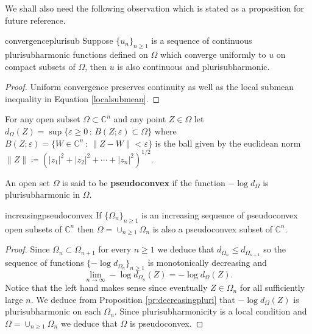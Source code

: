 We shall also need the following observation which is stated as a proposition for future reference.

\begin{myprop}{}{convergenceplurisub}
Suppose $\{u_n\}_{n\geq 1}$ is a sequence of continuous plurisubharmonic functions defined on $\Omega$ which converge uniformly to $u$ on compact subsets of $\Omega$, then $u$ is also continuous and plurisubharmonic.
\end{myprop}

\begin{proof}
Uniform convergence preserves continuity as well as the local submean inequality in Equation \ref{localsubmean}.
\end{proof}
For any open subset $\Omega\subset \mathbb{C}^n$ and any point $Z\in \Omega$ let $d_\Omega(Z) = \sup \{\varepsilon\geq 0\,:\, B(Z;\varepsilon)\subset \Omega\}$ where $B(Z;\varepsilon) = \{W\in \mathbb{C}^n\,:\, \|Z-W\|<\varepsilon\}$ is the ball given by the euclidean norm $\|Z\|\coloneqq (|z_1|^2+|z_2|^2+\cdots+|z_n|^2)^{1/2}$. \\

\begin{mydef}{}{}
An open set $\Omega$ is said to be {\bf pseudoconvex} if the function $-\log d_\Omega$ is plurisubharmonic in $\Omega$.
\end{mydef}

\begin{mytheo}{}{increasingpseudoconvex}
If $\{\Omega_n\}_{n\geq 1}$ is an increasing sequence of pseudoconvex open subsets of $\mathbb{C}^n$ then $\Omega = \cup_{n\geq 1}\Omega_n$ is also a pseudoconvex subset of $\mathbb{C}^n$.
\end{mytheo}

\begin{proof}
Since $\Omega_n\subset \Omega_{n+1}$ for every $n\geq 1$ we deduce that $d_{\Omega_n}\leq d_{\Omega_{n+1}}$ so the sequence of functions $\{-\log d_{\Omega_n}\}_{n\geq 1}$ is monotonically decreasing and 
$$\lim_{n\rightarrow \infty}-\log d_{\Omega_n}(Z)=-\log d_{\Omega}(Z).$$
Notice that the left hand makes sense since eventually $Z\in \Omega_n$ for all sufficiently large $n$. We deduce from Proposition \ref{pr:decreasingpluri} that $-\log d_{\Omega}(Z)$ is plurisubharmonic on each $\Omega_n$. Since plurisubharmonicity is a local condition and $\Omega = \cup_{n\geq 1}\Omega_n$ we deduce that $\Omega$ is pseudoconvex.
\end{proof}

